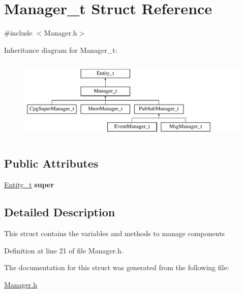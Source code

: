 \hypertarget{structManager__t}{
\section{Manager\_\-t Struct Reference}
\label{structManager__t}
}


{\ttfamily \#include $<$Manager.h$>$}

Inheritance diagram for Manager\_\-t:\begin{figure}[H]
\begin{center}
\leavevmode
\includegraphics[height=4.000000cm]{structManager__t}
\end{center}
\end{figure}
\subsection*{Public Attributes}
\begin{DoxyCompactItemize}
\item 
\hypertarget{structManager__t_a1e4ca325fcfbbf1699583e7cc807106a}{
\hyperlink{structEntity__t}{Entity\_\-t} {\bfseries super}}
\label{structManager__t_a1e4ca325fcfbbf1699583e7cc807106a}

\end{DoxyCompactItemize}


\subsection{Detailed Description}
This struct contains the variables and methods to manage components 

Definition at line 21 of file Manager.h.



The documentation for this struct was generated from the following file:\begin{DoxyCompactItemize}
\item 
\hyperlink{Manager_8h}{Manager.h}\end{DoxyCompactItemize}
